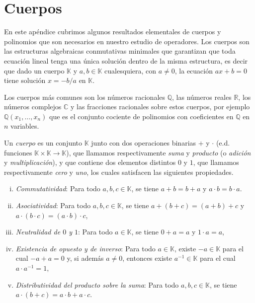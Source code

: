 \appendix

\chapter{Cuerpos}


En este apéndice cubrimos algunos resultados elementales de cuerpos y polinomios que son necesarios en nuestro estudio de operadores. Los cuerpos son las estructuras algebraicas conmutativas minimales que garantizan que toda ecuación lineal tenga una única solución dentro de la misma estructura, es decir que dado un cuerpo $\mathbb{K}$ y $a,b\in\mathbb{K}$ cualesquiera, con $a\ne 0$, la ecuación $ax+b=0$ tiene solución $x=-b/a$ en $\mathbb{K}$.

Los cuerpos más comunes son los números racionales $\mathbb{Q}$, las números reales $\mathbb{R}$, los números complejos $\mathbb{C}$ y las fracciones racionales sobre estos cuerpos, por ejemplo $\mathbb{Q}(x_1,\ldots,x_n)$ que es el conjunto cociente de polinomios con coeficientes en $\mathbb{Q}$ en $n$ variables. 

\begin{defn}\label{defcuerpo}
Un \emph{cuerpo} es un conjunto $\mathbb{K}$ junto con dos operaciones binarias $+$ y $\cdot$ (e.d. funciones $\mathbb{K}\times \mathbb{K}\rightarrow \mathbb{K}$), que llamamos respectivamente \emph{suma} y \emph{producto} (o \emph{adición} y \emph{multiplicación}), y que contiene dos elementos distintos $0$ y $1$, que llamamos respectivamente \emph{cero} y \emph{uno}, los cuales satisfacen las siguientes propiedades.
\begin{enumerate}[(i)]
\item \emph{Commutatividad}: Para todo $a,b,c\in \mathbb{K}$, se tiene $a+b=b+a$ y $a\cdot b=b\cdot a$.
\item \emph{Asociatividad}: Para todo $a,b,c\in \mathbb{K}$, se tiene $a+(b+c)=(a+b)+c$ y $a\cdot(b\cdot c)=(a\cdot b)\cdot c$,
\item \emph{Neutralidad de $0$ y $1$}: Para todo $a\in \mathbb{K}$, se tiene $0+a=a$ y $1\cdot a=a$,
\item \emph{Existencia de opuesto y de inverso}: Para todo $a\in \mathbb{K}$, existe $-a\in \mathbb{K}$ para el cual $-a+a=0$ y, si además $a\ne 0$, entonces existe $a^{-1}\in \mathbb{K}$ para el cual $a\cdot a^{-1}=1$,
\item \emph{Distributividad del producto sobre la suma}: Para todo $a,b,c\in \mathbb{K}$, se tiene $a\cdot(b+c)=a\cdot b+a\cdot c$. 
\end{enumerate}
\end{defn}

